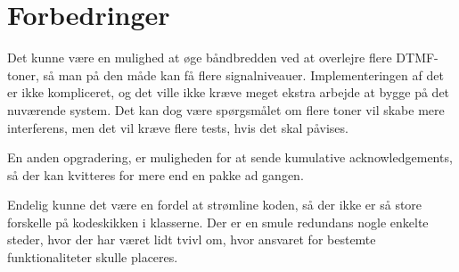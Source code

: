 \section{Forbedringer}

Det kunne være en mulighed at øge båndbredden ved at overlejre flere DTMF-toner, så man på den måde kan få flere signalniveauer. Implementeringen af det er ikke kompliceret, og det ville ikke kræve meget ekstra arbejde at bygge på det nuværende system. Det kan dog være spørgsmålet om flere toner vil skabe mere interferens, men det vil kræve flere tests, hvis det skal påvises. 

En anden opgradering, er muligheden for at sende kumulative acknowledgements, så der kan kvitteres for mere end en pakke ad gangen. 

Endelig kunne det være en fordel at strømline koden, så der ikke er så store forskelle på kodeskikken i klasserne. Der er en smule redundans nogle enkelte steder, hvor der har været lidt tvivl om, hvor ansvaret for bestemte funktionaliteter skulle placeres. 